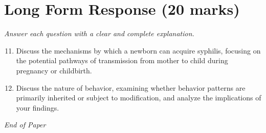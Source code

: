 \documentclass[12pt]{article}
\begin{document}
\section*{Long Form Response (20 marks)}
\textit{Answer each question with a clear and complete explanation.}
\begin{enumerate}[label=\arabic*.]
\setcounter{enumi}{10}
\item Discuss the mechanisms by which a newborn can acquire syphilis, focusing on the potential
pathways of transmission from mother to child during pregnancy or childbirth.
\item Discuss the nature of behavior, examining whether behavior patterns are primarily
inherited or subject to modification, and analyze the implications of your findings.
\end{enumerate}

\vfill
\noindent\textit{End of Paper}
\end{document}

